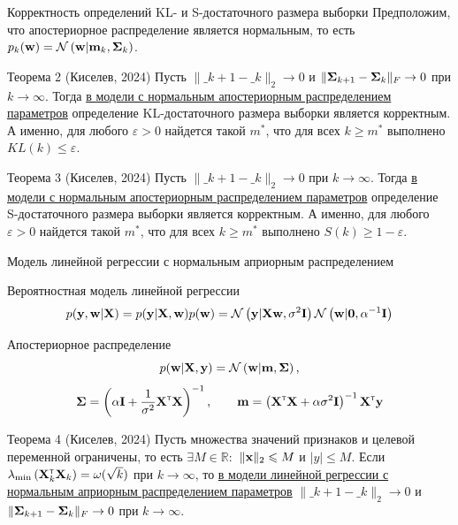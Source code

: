 \documentclass[aspectratio=169]{beamer}
\begin{document}
\begin{frame}{Корректность определений KL- и S-достаточного размера выборки}
    Предположим, что апостериорное распределение является нормальным, то есть $p_k(\mathbf{w}) = \mathcal{N}\left( \mathbf{w} | \mathbf{m}_k, \boldsymbol{\Sigma}_k \right)$.
    \begin{block}{Теорема 2 (Киселев, 2024)}
            Пусть $\| \bm_{k+1} - \bm_k \|_2 \to 0$ и $\| \boldsymbol{\Sigma}_{k+1} - \boldsymbol{\Sigma}_k \|_{F} \to 0$ при $k \to \infty$. Тогда \underline{в модели с нормальным апостериорным распределением параметров} определение KL-достаточного размера выборки является корректным. А именно, для любого $\varepsilon > 0$ найдется такой $m^*$, что для всех $k \geqslant m^*$ выполнено $KL(k) \leqslant \varepsilon$.
    \end{block}
    \begin{block}{Теорема 3 (Киселев, 2024)}
        Пусть $\| \bm_{k+1} - \bm_k \|_2 \to 0$ при $k \to \infty$. Тогда \underline{в модели с нормальным апостериорным распределением параметров} определение S-достаточного размера выборки является корректным. А именно, для любого $\varepsilon > 0$ найдется такой $m^*$, что для всех $k \geqslant m^*$ выполнено $S(k) \geqslant 1-\varepsilon$.
    \end{block}
\end{frame}

\begin{frame}{Модель линейной регрессии с нормальным априорным распределением}
    \begin{block}{Вероятностная модель линейной регрессии}
        \vspace{-0.3cm}
        \[ p(\mathbf{y}, \mathbf{w} | \mathbf{X}) = p(\mathbf{y} | \mathbf{X}, \mathbf{w}) p(\mathbf{w}) = \mathcal{N}\left( \mathbf{y} | \mathbf{X} \mathbf{w}, \sigma^2 \mathbf{I} \right) \mathcal{N}\left( \mathbf{w} | \mathbf{0}, \alpha^{-1} \mathbf{I} \right) \]
        \vspace{-0.7cm}
    \end{block}
    \begin{block}{Апостериорное распределение}
        \vspace{-0.3cm}
        \[ p(\mathbf{w} | \mathbf{X}, \mathbf{y}) = \mathcal{N}\left( \mathbf{w} | \mathbf{m}, \boldsymbol{\Sigma} \right), \]
        \[ \boldsymbol{\Sigma} = \left( \alpha \mathbf{I} + \dfrac{1}{\sigma^2} \mathbf{X}^{\text{\tiny\sffamily\upshape\mdseries T}} \mathbf{X} \right)^{-1}, \qquad \mathbf{m} = \left( \mathbf{X}^{\text{\tiny\sffamily\upshape\mdseries T}} \mathbf{X} + \alpha \sigma^2 \mathbf{I} \right)^{-1} \mathbf{X}^{\text{\tiny\sffamily\upshape\mdseries T}} \mathbf{y} \]
        \vspace{-0.5cm}
    \end{block}
    \begin{block}{Теорема 4 (Киселев, 2024)}
        Пусть множества значений признаков и целевой переменной ограничены, то есть $\exists M \in \mathbb{R}:$ $\| \mathbf{x} \|_2 \leqslant M$ и $|y| \leqslant M$. Если  $\lambda_{\min}\left( \mathbf{X}^{\text{\tiny\sffamily\upshape\mdseries T}}_k \mathbf{X}_k \right) = \omega(\sqrt{k})$ при $k \to \infty$, то \underline{в модели линейной регрессии с нормальным априорным распределением параметров} $\| \bm_{k+1} - \bm_k \|_2 \to 0$ и  $\| \boldsymbol{\Sigma}_{k+1} - \boldsymbol{\Sigma}_k \|_{F} \to 0$ при $k \to \infty$.
    \end{block}
\end{frame}
\end{document}
